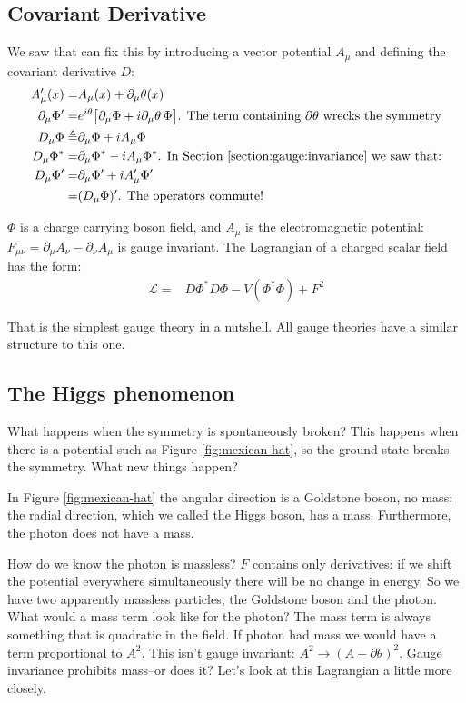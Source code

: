 \documentclass[]{article}
\begin{document}
\subsection{Covariant Derivative}
We saw that can fix this by introducing a vector potential $A_\mu$ and defining the covariant derivative $D$:
\begin{align*}
	A^\prime_\mu(x) =& A_\mu(x) + \partial_\mu \theta(x)\\
	\partial_\mu \Phi^\prime =& e^{i\theta} \big[\partial_\mu \Phi + i \partial_\mu \theta \,\Phi\big] \text{. The term containing $\partial \theta$  wrecks the symmetry}\\
	D_\mu \Phi \triangleq& \partial_\mu \Phi + i A_\mu \Phi\\
	D_\mu \Phi^* =& \partial_\mu \Phi^* - i A_\mu \Phi^* \text{. In Section \ref{section:gauge:invariance} we saw that:}\\
	D_\mu \Phi^\prime =& \partial_\mu \Phi^\prime + i A^\prime_\mu \Phi^\prime \\
	=& (D_\mu \Phi)^\prime \text{. The operators commute!}
\end{align*}

$\Phi$ is a charge carrying boson field, and $A_\mu$ is the electromagnetic potential: $F_{\mu\nu}=\partial_\mu A_\nu-\partial_\nu A_\mu$ is gauge invariant. The Lagrangian of a charged scalar field has the form:
\begin{align*}
	\mathcal{L} =& D\Phi^* D\Phi -V(\Phi^*\Phi) +F^2
\end{align*} 

That is the simplest gauge theory in a nutshell. All gauge theories have a similar structure to this one.

\subsection{The Higgs phenomenon}

What happens when the symmetry is spontaneously broken? This happens when there is a potential such as Figure \ref{fig:mexican-hat}, so the ground state breaks the symmetry. What new things happen?

In Figure \ref{fig:mexican-hat} the angular direction is a Goldstone boson, no mass; the radial direction, which we called the Higgs boson, has a mass. Furthermore, the photon does not have a mass.

How do we know the photon is massless? $F$ contains only derivatives: if we shift the potential everywhere simultaneously there will be no change in energy. So we have two apparently massless particles, the Goldstone boson and the photon. What would a mass term look like for the photon? The mass term is always something that is quadratic in the field. If photon had mass we would have a term proportional to $A^2$. This isn't gauge invariant: $A^2 \rightarrow (A+\partial \theta)^2$. Gauge invariance prohibits mass--or does it? Let's look at this Lagrangian a little more closely.
\end{document}
